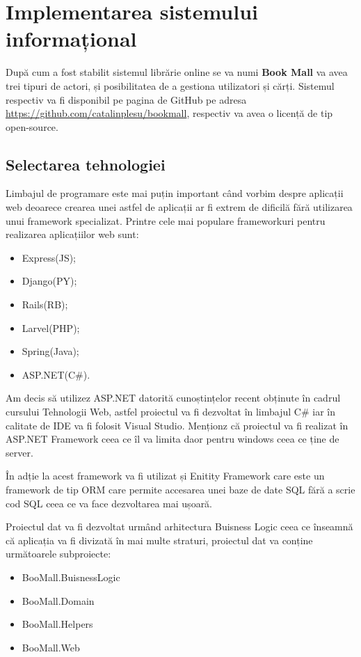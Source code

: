 \clearpage
\section{Implementarea sistemului informațional}

După cum a fost stabilit sistemul librărie online se
va numi \textbf{Book Mall} va avea trei tipuri de actori, și posibilitatea de a 
gestiona utilizatori și cărți. Sistemul respectiv va fi disponibil pe pagina de
GitHub pe adresa \url{https://github.com/catalinplesu/bookmall}, respectiv va 
avea o licență de tip open-source.

\subsection{Selectarea tehnologiei}
Limbajul de programare este mai puțin important când vorbim despre aplicații
web deoarece crearea unei astfel de aplicații ar fi extrem de dificilă fără
utilizarea unui framework specializat. Printre cele mai populare frameworkuri
pentru realizarea aplicațiilor web sunt:
\begin{itemize}
    \item Express(JS);
    \item Django(PY);
    \item Rails(RB);
    \item Larvel(PHP);
    \item Spring(Java);
    \item ASP.NET(C\#).
\end{itemize}
Am decis să utilizez ASP.NET datorită cunoștințelor recent obținute în cadrul
cursului Tehnologii Web, astfel proiectul va fi dezvoltat în limbajul C\# iar
în calitate de IDE va fi folosit Visual Studio. Menționz că proiectul va fi
realizat în ASP.NET Framework ceea ce îl va limita daor pentru windows ceea ce
ține de server.

În adție la acest framework va fi utilizat și Enitity Framework care este un 
framework de tip ORM care permite accesarea unei baze de date SQL fără a scrie 
cod SQL ceea ce va face dezvoltarea mai ușoară.

Proiectul dat va fi dezvoltat urmând arhitectura Buisness Logic ceea ce
înseamnă că aplicația va fi divizată în mai multe straturi, proiectul dat va
conține următoarele subproiecte: 
\begin{itemize}
\item BooMall.BuisnessLogic
\item BooMall.Domain
\item BooMall.Helpers
\item BooMall.Web
\end{itemize}

